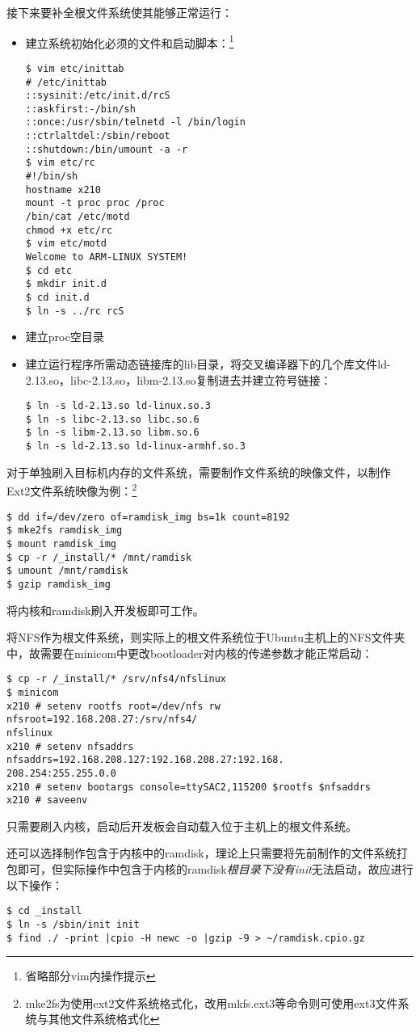 \documentclass[hyperref,UTF8]{ctexart}
\begin{document}
接下来要补全根文件系统使其能够正常运行：
\begin{itemize}
    \item
{
    建立系统初始化必须的文件和启动脚本：\footnote{省略部分vim内操作提示}
\begin{Verbatim}[frame=single]
$ vim etc/inittab
# /etc/inittab
::sysinit:/etc/init.d/rcS
::askfirst:-/bin/sh
::once:/usr/sbin/telnetd -l /bin/login
::ctrlaltdel:/sbin/reboot
::shutdown:/bin/umount -a -r
$ vim etc/rc
#!/bin/sh
hostname x210
mount -t proc proc /proc
/bin/cat /etc/motd
chmod +x etc/rc
$ vim etc/motd
Welcome to ARM-LINUX SYSTEM!
$ cd etc
$ mkdir init.d
$ cd init.d
$ ln -s ../rc rcS
\end{Verbatim}
}
    \item 建立proc空目录
    \item 建立运行程序所需动态链接库的lib目录，将交叉编译器下的几个库文件ld-2.13.so，libc-2.13.so，libm-2.13.so复制进去并建立符号链接：
\begin{Verbatim}[frame=single]
$ ln -s ld-2.13.so ld-linux.so.3
$ ln -s libc-2.13.so libc.so.6
$ ln -s libm-2.13.so libm.so.6
$ ln -s ld-2.13.so ld-linux-armhf.so.3
\end{Verbatim}
\end{itemize}

对于单独刷入目标机内存的文件系统，需要制作文件系统的映像文件，以制作Ext2文件系统映像为例：\footnote{mke2fs为使用ext2文件系统格式化，改用mkfs.ext3等命令则可使用ext3文件系统与其他文件系统格式化}
\begin{Verbatim}[frame=single]
$ dd if=/dev/zero of=ramdisk_img bs=1k count=8192
$ mke2fs ramdisk_img
$ mount ramdisk_img
$ cp -r /_install/* /mnt/ramdisk
$ umount /mnt/ramdisk
$ gzip ramdisk_img
\end{Verbatim}
将内核和ramdisk刷入开发板即可工作。

将NFS作为根文件系统，则实际上的根文件系统位于Ubuntu主机上的NFS文件夹中，故需要在minicom中更改bootloader对内核的传递参数才能正常启动：
\begin{Verbatim}[frame=single]
$ cp -r /_install/* /srv/nfs4/nfslinux
$ minicom
x210 # setenv rootfs root=/dev/nfs rw nfsroot=192.168.208.27:/srv/nfs4/
nfslinux
x210 # setenv nfsaddrs nfsaddrs=192.168.208.127:192.168.208.27:192.168.
208.254:255.255.0.0
x210 # setenv bootargs console=ttySAC2,115200 $rootfs $nfsaddrs
x210 # saveenv
\end{Verbatim}
只需要刷入内核，启动后开发板会自动载入位于主机上的根文件系统。

还可以选择制作包含于内核中的ramdisk，理论上只需要将先前制作的文件系统打包即可，但实际操作中包含于内核的ramdisk\emph{根目录下没有init}无法启动，故应进行以下操作：
\begin{Verbatim}[frame=single]
$ cd _install
$ ln -s /sbin/init init
$ find ./ -print |cpio -H newc -o |gzip -9 > ~/ramdisk.cpio.gz
\end{Verbatim}
\end{document}
